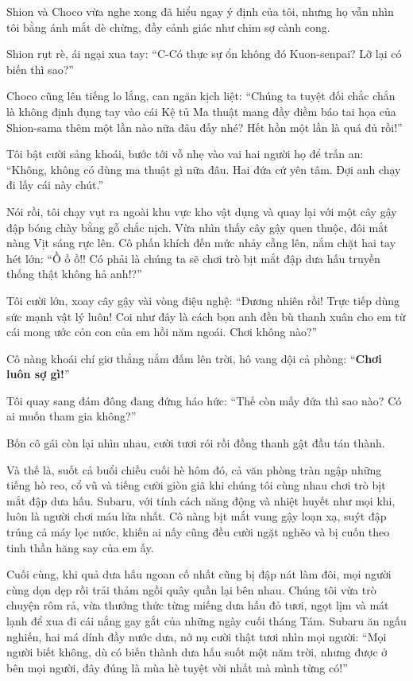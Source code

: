 \documentclass[../main.tex]{subfiles}
\begin{document}
Shion và Choco vừa nghe xong đã hiểu ngay ý định của tôi, nhưng họ vẫn nhìn tôi bằng ánh mắt dè chừng, đầy cảnh giác như chim sợ cành cong.

Shion rụt rè, ái ngại xua tay:
``C-Có thực sự ổn không đó Kuon-senpai? Lỡ lại có biến thì sao?''

Choco cũng lên tiếng lo lắng, can ngăn kịch liệt:
``Chúng ta tuyệt đối chắc chắn là không định đụng tay vào cái Kệ tủ Ma thuật mang đầy điềm báo tai họa của Shion-sama thêm một lần nào nữa đâu đấy nhé? Hết hồn một lần là quá đủ rồi!''

Tôi bật cười sảng khoái, bước tới vỗ nhẹ vào vai hai người họ để trấn an: ``Không, không có dùng ma thuật gì nữa đâu. Hai đứa cứ yên tâm. Đợi anh chạy đi lấy cái này chút.''

Nói rồi, tôi chạy vụt ra ngoài khu vực kho vật dụng và quay lại với một cây gậy đập bóng chày bằng gỗ chắc nịch. Vừa nhìn thấy cây gậy quen thuộc, đôi mắt nàng Vịt sáng rực lên. Cô phấn khích đến mức nhảy cẫng lên, nắm chặt hai tay hét lớn:
``Ồ ồ ồ!! Có phải là chúng ta sẽ chơi trò bịt mắt đập dưa hấu truyền thống thật không hả anh!?''

Tôi cười lớn, xoay cây gậy vài vòng điệu nghệ:
``Đương nhiên rồi! Trực tiếp dùng sức mạnh vật lý luôn! Coi như đây là cách bọn anh đền bù thanh xuân cho em từ cái mong ước cỏn con của em hồi năm ngoái. Chơi không nào?''

Cô nàng khoái chí giơ thẳng nắm đấm lên trời, hô vang dội cả phòng:
``\textbf{Chơi luôn sợ gì!}''

Tôi quay sang đám đông đang đứng háo hức:
``Thế còn mấy đứa thì sao nào? Có ai muốn tham gia không?''

Bốn cô gái còn lại nhìn nhau, cười tươi rói rồi đồng thanh gật đầu tán thành.

Và thế là, suốt cả buổi chiều cuối hè hôm đó, cả văn phòng tràn ngập những tiếng hò reo, cổ vũ và tiếng cười giòn giã khi chúng tôi cùng nhau chơi trò bịt mắt đập dưa hấu. Subaru, với tính cách năng động và nhiệt huyết như mọi khi, luôn là người chơi máu lửa nhất. Cô nàng bịt mắt vung gậy loạn xạ, suýt đập trúng cả máy lọc nước, khiến ai nấy cũng đều cười ngặt nghẽo và bị cuốn theo tinh thần hăng say của em ấy.

Cuối cùng, khi quả dưa hấu ngoan cố nhất cũng bị đập nát làm đôi, mọi người cùng dọn dẹp rồi trải thảm ngồi quây quần lại bên nhau. Chúng tôi vừa trò chuyện rôm rả, vừa thưởng thức từng miếng dưa hấu đỏ tươi, ngọt lịm và mát lạnh để xua đi cái nắng gay gắt của những ngày cuối tháng Tám. Subaru ăn ngấu nghiến, hai má dính đầy nước dưa, nở nụ cười thật tươi nhìn mọi người:
``Mọi người biết không, dù có biến thành dưa hấu suốt một năm trời, nhưng được ở bên mọi người, đây đúng là mùa hè tuyệt vời nhất mà mình từng có!''
\end{document}
